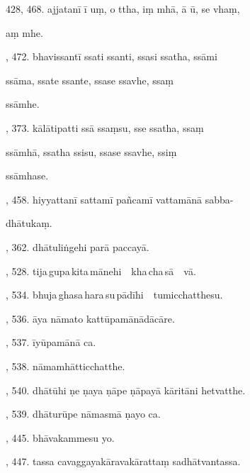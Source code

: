 428, 468. ajjatanī ī uṃ, o ttha, iṃ mhā, ā ū, se vhaṃ,\par \noindent
\hspace{15mm} aṃ mhe.\hfill \pageref{sut:428}\par {}, 472. bhavissantī ssati ssanti, ssasi ssatha, ssāmi\par \noindent
\hspace{15mm} ssāma, ssate ssante, ssase ssavhe, ssaṃ\par \noindent
\hspace{15mm} ssāmhe.\hfill \pageref{sut:429}\par {}, 373. kālātipatti ssā ssaṃsu, sse ssatha, ssaṃ\par \noindent
\hspace{15mm} ssāmhā, ssatha ssisu, ssase ssavhe, ssiṃ\par \noindent
\hspace{15mm} ssāmhase.\hfill \pageref{sut:430}\par {}, 458. hiyyattanī sattamī pañcamī vattamānā sabba-\par \noindent
\hspace{15mm} dhātukaṃ.\hfill \pageref{sut:431}\par {}, 362. dhātuliṅgehi parā paccayā.\hfill \pageref{sut:432}\par {}, 528. tija\,gupa\,kita\,mānehi\ \ kha\,cha\,sā\ \ vā.\hfill \pageref{sut:433}\par {}, 534. bhuja\,ghasa\,hara\,su\,pādīhi\ \ tumicchatthesu.\hfill \pageref{sut:434}\par {}, 536. āya nāmato kattūpamānādācāre.\hfill \pageref{sut:435}\par {}, 537. īyūpamānā ca.\hfill \pageref{sut:436}\par {}, 538. nāmamhātticchatthe.\hfill \pageref{sut:437}\par {}, 540. dhātūhi ṇe ṇaya ṇāpe ṇāpayā kāritāni hetvatthe.\par \noindent
\hspace{15mm}\hfill \pageref{sut:438}\par {}, 539. dhāturūpe nāmasmā ṇayo ca.\hfill \pageref{sut:439}\par {}, 445. bhāvakammesu yo.\hfill \pageref{sut:440}\par {}, 447. tassa cavaggayakāravakārattaṃ sadhātvantassa.\par \noindent
\hspace{15mm}\hfill \pageref{sut:441}\par \noindent
